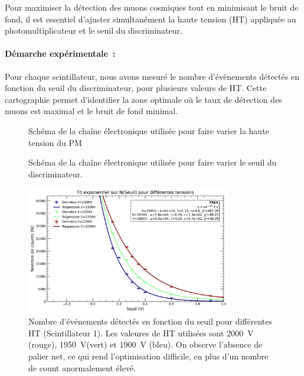 \documentclass[a4paper,12pt,twoside]{article}
\begin{document}

\vspace{1em}
\begin{center}
\begin{tcolorbox}[colback=blue!5!white, colframe=blue!60!black, title=Optimisation conjointe des réglages électroniques]
Pour maximiser la détection des muons cosmiques tout en minimisant le bruit de fond, il est essentiel d’ajuster simultanément la haute tension (HT) appliquée au photomultiplicateur et le seuil du discriminateur.
\end{tcolorbox}
\end{center}


\paragraph{Démarche expérimentale~:}
Pour chaque scintillateur, nous avons mesuré le nombre d’événements détectés en fonction du seuil du discriminateur, pour plusieurs valeurs de HT. Cette cartographie permet d’identifier la zone optimale où le taux de détection des muons est maximal et le bruit de fond minimal.

\begin{figure}[H]
  \centering
  
  \caption{Schéma de la chaîne électronique utilisée pour faire varier la haute tension du PM}
  \label{fig:variation_HT}
\end{figure}

\begin{figure}[H]
  \centering
  
  \caption{Schéma de la chaîne électronique utilisée pour faire varier le seuil du discriminateur.}
  \label{fig:variation_seuil}
\end{figure}


\begin{figure}[H]
    \centering
    \includegraphics[width=0.8\textwidth]{Images/Threshold_Scintillateur_1.png}
    \caption{Nombre d’événements détectés en fonction du seuil pour différentes HT (Scintillateur 1).
    Les valeures de HT utilisées sont 2000~V (rouge), 1950~V(vert) et 1900~V (bleu).
    On observe l'absence de palier net, ce qui rend l'optimisation difficile, en plus d'un nombre de count anormalement élevé.}
    \label{fig:optimisation_scint1}
\end{figure}
\end{document}
